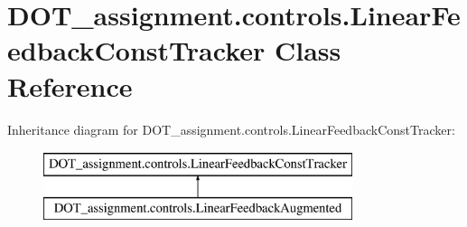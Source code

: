 \hypertarget{class_d_o_t__assignment_1_1controls_1_1_linear_feedback_const_tracker}{}\section{D\+O\+T\+\_\+assignment.\+controls.\+Linear\+Feedback\+Const\+Tracker Class Reference}
\label{class_d_o_t__assignment_1_1controls_1_1_linear_feedback_const_tracker}
Inheritance diagram for D\+O\+T\+\_\+assignment.\+controls.\+Linear\+Feedback\+Const\+Tracker\+:\begin{figure}[H]
\begin{center}
\leavevmode
\includegraphics[height=2.000000cm]{class_d_o_t__assignment_1_1controls_1_1_linear_feedback_const_tracker}
\end{center}
\end{figure}
